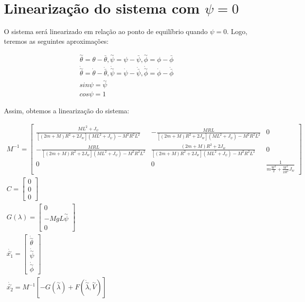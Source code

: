 \documentclass[10pt]{article}
\begin{document}
\newpage

\section{Linearização do sistema com $\psi = 0$}

\quad O sistema será linearizado em relação ao ponto de equilíbrio quando $\psi = 0$. Logo,
teremos as seguintes aproximações:

\begin{equation}
\begin{gathered}
    \overset{\sim}{\theta} = \theta - \bar\theta ,
    \overset{\sim}{\psi} = \psi - \bar\psi ,
    \overset{\sim}{\phi} = \phi - \bar\phi \\
    \dot{\overset{\sim}{\theta}} = \dot\theta - \dot{\bar\theta} ,
    \dot{\overset{\sim}{\psi}} = \dot\psi - \dot{\bar\psi} ,
    \dot{\overset{\sim}{\phi}} = \dot\phi - \dot{\bar\phi} \\
    sin{\psi} = \overset{\sim}{\psi} \\
    cos{\psi} = 1
\end{gathered}
\end{equation}

\quad Assim, obtemos a linearização do sistema:

\begin{equation}
\begin{gathered}
    M^{-1} =
    \begin{bmatrix}
        \frac{ML^2 + J_\psi}{[(2m + M)R^2 + 2J_w](ML^2 + J_\psi) - M^2R^2L^2} & -\frac{MRL}{[(2m + M)R^2 + 2J_w](ML^2 + J_\psi) - M^2R^2L^2} & 0 \\
        -\frac{MRL}{[(2m + M)R^2 + 2J_w](ML^2 + J_\psi) - M^2R^2L^2} & \frac{(2m + M)R^2 + 2J_w}{[(2m + M)R^2 + 2J_w](ML^2 + J_\psi) - M^2R^2L^2} & 0 \\
        0 & 0 & \frac{1}{m\frac{W^2}{2} + \frac{W^2}{2R^2}J_w}
    \end{bmatrix} \\
    C =
    \begin{bmatrix}
        0 \\ 0 \\ 0
    \end{bmatrix} \\
    G(\lambda) =
    \begin{bmatrix}
        0 \\ -MgL\overset{\sim}{\psi} \\ 0
    \end{bmatrix} \\
    \dot{\overset{\sim}{x_1}} = \begin{bmatrix}
        \dot{\overset{\sim}{\theta}} \\
        \dot{\overset{\sim}{\psi}} \\
        \dot{\overset{\sim}{\phi}}
    \end{bmatrix} \\
    \dot{\overset{\sim}{x_2}} = M^{-1} \left[ - G( \overset{\sim}{\lambda} ) + F( \dot{\overset{\sim}{\lambda}} , \overset{\sim}{V} ) \right]
\end{gathered}
\end{equation}
\end{document}
